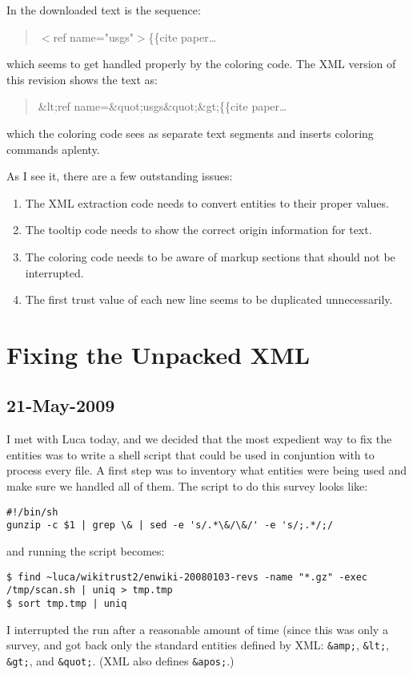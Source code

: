 In the downloaded text is the sequence:
\begin{quote}
$<$ref name="usgs"$>$\{\{cite paper\ldots
\end{quote}
which seems to get handled properly by the coloring code.
The XML version of this revision shows the text as:
\begin{quote}
\&lt;ref name=\&quot;usgs\&quot;\&gt;\{\{cite paper\ldots
\end{quote}
which the coloring code sees as separate text segments
and inserts coloring commands aplenty.


As I see it, there are a few outstanding issues:
\begin{enumerate}
\item The XML extraction code needs to convert entities to their
    proper values.
\item The tooltip code needs to show the correct origin information
    for text.
\item The coloring code needs to be aware of markup sections
    that should not be interrupted.
\item The first trust value of each new line seems to be
    duplicated unnecessarily.
\end{enumerate}


\section{Fixing the Unpacked XML}

\subsection{21-May-2009}
\label{sec:origin-fixxml}

I met with Luca today, and we decided that the most expedient
way to fix the entities was to write a shell script that could
be used in conjuntion with  to process every file.
A first step was to inventory what entities were being used and
make sure we handled all of them.
The script to do this survey looks like:
\begin{verbatim}
#!/bin/sh
gunzip -c $1 | grep \& | sed -e 's/.*\&/\&/' -e 's/;.*/;/
\end{verbatim}
and running the script becomes:
\begin{verbatim}
$ find ~luca/wikitrust2/enwiki-20080103-revs -name "*.gz" -exec /tmp/scan.sh | uniq > tmp.tmp
$ sort tmp.tmp | uniq
\end{verbatim}
I interrupted the run after a reasonable amount of time (since this
was only a survey, and got back only the standard entities defined by
XML: \texttt{\&amp;}, \texttt{\&lt;}, \texttt{\&gt;}, and \texttt{\&quot;}.
(XML also defines \texttt{\&apos;}.)

